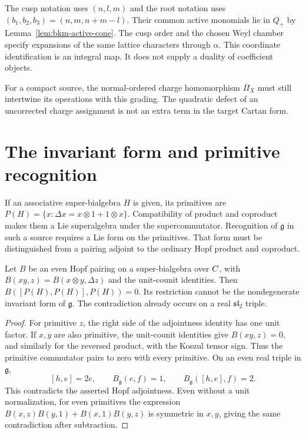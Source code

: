 \begin{remark}
\label{rem:bkm-two-polarizations}
The cusp notation uses $(n,l,m)$ and the root notation uses
$(b_1,b_2,b_3)=(n,m,n+m-l)$. Their common active monomials lie in
$Q_+$ by Lemma~\ref{lem:bkm-active-cone}. The cusp order and the
chosen Weyl chamber specify expansions of the same lattice
characters through $\alpha$. This coordinate identification is an
integral map. It does not supply a duality of coefficient objects.

For a compact source, the normal-ordered charge homomorphism
$\overline\Pi_X$ must still intertwine its operations with this
grading. The quadratic defect of an uncorrected charge assignment
is not an extra term in the target Cartan form.
\end{remark}

\section{The invariant form and primitive recognition}
\label{sec:bkm-primitive-comparison}

If an associative super-bialgebra $H$ is given, its primitives are
$P(H)=\{x:\Delta x=x\otimes1+1\otimes x\}$.
Compatibility of product and coproduct makes them a Lie
superalgebra under the supercommutator. Recognition of
$\mathfrak g$ in such a source requires a Lie form on the primitives.
That form must be distinguished from a pairing adjoint to the
ordinary Hopf product and coproduct.

\begin{proposition}
\label{prop:bkm-hopf-pairing-obstruction}
Let $B$ be an even Hopf pairing on a super-bialgebra over $C$,
with $B(xy,z)=B(x\otimes y,\Delta z)$ and the unit-counit
identities. Then $B([P(H),P(H)],P(H))=0$.
Its restriction cannot be the nondegenerate invariant form of
$\mathfrak g$. The contradiction already occurs on a real
$\mathfrak{sl}_2$ triple.
\end{proposition}
\begin{proof}
For primitive $z$, the right side of the adjointness identity has
one unit factor. If $x,y$ are also primitive, the unit-counit
identities give $B(xy,z)=0$, and similarly for the reversed product,
with the Koszul tensor sign. Thus the primitive commutator pairs
to zero with every primitive. On an even real triple in
$\mathfrak g$,
\[
 [h,e]=2e,\qquad B_{\mathfrak g}(e,f)=1,
 \qquad B_{\mathfrak g}([h,e],f)=2.
\]
This contradicts the asserted Hopf adjointness. Even without a unit
normalization, for even primitives the expression
$B(x,z)B(y,1)+B(x,1)B(y,z)$ is symmetric in $x,y$, giving the
same contradiction after subtraction.
\end{proof}

